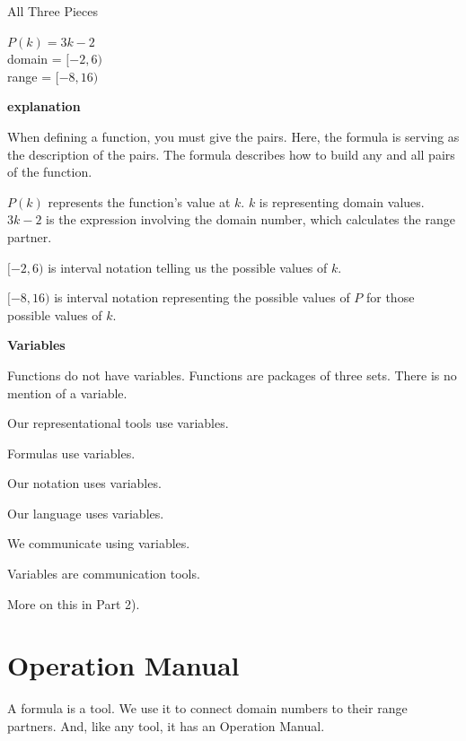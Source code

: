 \documentclass{ximera}
\begin{document}
\begin{example}   All Three Pieces 

$P(k) = 3k - 2$ \\
domain = $[-2, 6)$ \\
range = $[-8, 16)$


\textbf{\textcolor{red!75!green}{explanation}} 


When defining a function, you must give the pairs.  Here, the formula is serving as the description of the pairs. The formula describes how to build any and all pairs of the function.

$P(k)$ represents the function's value at $k$.  $k$ is representing domain values. $3k - 2$ is the expression involving the domain number, which calculates the range partner. 

$[-2, 6)$ is interval notation telling us the possible values of $k$. 

$[-8, 16)$ is interval notation representing the possible values of $P$ for those possible values of $k$.  


\end{example}




\begin{warning} \textbf{\textcolor{red!70!darkgray}{Variables}}    

Functions do not have variables.  Functions are packages of three sets.  There is no mention of a variable. 

Our representational tools use variables. 

Formulas use variables. 

Our notation uses variables. 

Our language uses variables. 

We communicate using variables.  

Variables are communication tools. 

\end{warning}

More on this in Part 2). 




\section*{Operation Manual}

A formula is a tool.  We use it to connect domain numbers to their range partners.  And, like any tool, it has an Operation Manual.
\end{document}
